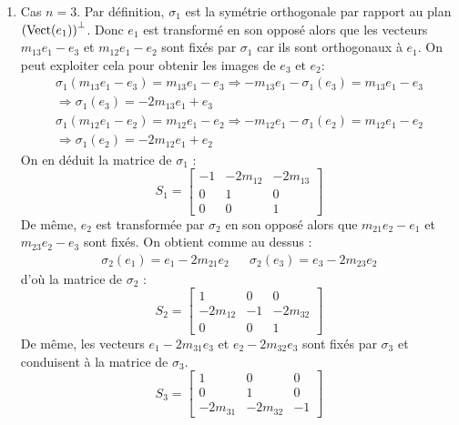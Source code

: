 \begin{enumerate}
\item Cas $n=3$. Par définition, $\sigma_1$ est la symétrie orthogonale par rapport au plan $\left(\operatorname{Vect}(e_1) \right)^{\perp}$. Donc $e_1$ est transformé en son opposé alors que les vecteurs $m_{13}e_1-e_3$ et $m_{12}e_1-e_2$ sont fixés par $\sigma_1$ car ils sont orthogonaux à $e_1$. On peut exploiter cela pour obtenir les images de $e_3$ et $e_2$:
\begin{multline*}
 \sigma_1(m_{13}e_1-e_3)=m_{13}e_1-e_3 \Rightarrow -m_{13}e_1-\sigma_1(e_3)=m_{13}e_1-e_3 \\
\Rightarrow \sigma_1(e_3) = -2m_{13}e_1 +e_3
\end{multline*}
\begin{multline*}
 \sigma_1(m_{12}e_1-e_2)=m_{12}e_1-e_2 \Rightarrow -m_{12}e_1-\sigma_1(e_2)=m_{12}e_1-e_2 \\
\Rightarrow \sigma_1(e_2) = -2m_{12}e_1 +e_2
\end{multline*}
On en déduit la matrice de $\sigma_1$ :
\begin{displaymath}
 S_1 =
\begin{bmatrix}
 -1 & -2m_{12} & -2m_{13} \\
0 & 1 & 0 \\
0 & 0 & 1 
\end{bmatrix}
\end{displaymath}
De même, $e_2$ est transformée par $\sigma_2$ en son opposé alors que $m_{21}e_2-e_1$ et $m_{23}e_2-e_3$ sont fixés. On obtient comme au dessus :
\begin{align*}
 \sigma_2(e_1)=e_1-2m_{21}e_2 & & \sigma_2(e_3) = e_3 -2m_{23}e_2
\end{align*}
d'où la matrice de $\sigma_2$ :
\begin{displaymath}
 S_2 = 
\begin{bmatrix}
 1 & 0 & 0 \\
-2m_{12} & -1 & -2m_{32} \\
0 & 0 & 1
\end{bmatrix}
\end{displaymath}
De même, les vecteurs $e_1-2m_{31}e_3$ et $e_2-2m_{32}e_3$ sont fixés par $\sigma_3$ et conduisent à la matrice de $\sigma_3$.
\begin{displaymath}
 S_3=
\begin{bmatrix}
 1 & 0 & 0 \\
0 & 1 & 0 \\
-2m_{31} & -2m_{32} & -1
\end{bmatrix}
\end{displaymath}


\end{enumerate}
